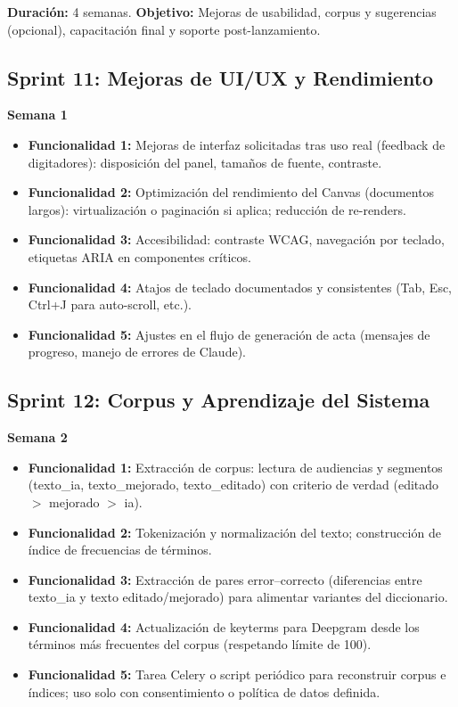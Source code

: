 \documentclass[12pt,a4paper]{report}
\begin{document}
\textbf{Duración:} 4 semanas. \textbf{Objetivo:} Mejoras de usabilidad, corpus y sugerencias (opcional), capacitación final y soporte post-lanzamiento.

\subsection{Sprint 11: Mejoras de UI/UX y Rendimiento}

\textbf{Semana 1}

\begin{itemize}
    \item \textbf{Funcionalidad 1:} Mejoras de interfaz solicitadas tras uso real (feedback de digitadores): disposición del panel, tamaños de fuente, contraste.
    \item \textbf{Funcionalidad 2:} Optimización del rendimiento del Canvas (documentos largos): virtualización o paginación si aplica; reducción de re-renders.
    \item \textbf{Funcionalidad 3:} Accesibilidad: contraste WCAG, navegación por teclado, etiquetas ARIA en componentes críticos.
    \item \textbf{Funcionalidad 4:} Atajos de teclado documentados y consistentes (Tab, Esc, Ctrl+J para auto-scroll, etc.).
    \item \textbf{Funcionalidad 5:} Ajustes en el flujo de generación de acta (mensajes de progreso, manejo de errores de Claude).
\end{itemize}

\subsection{Sprint 12: Corpus y Aprendizaje del Sistema}

\textbf{Semana 2}

\begin{itemize}
    \item \textbf{Funcionalidad 1:} Extracción de corpus: lectura de audiencias y segmentos (texto\_ia, texto\_mejorado, texto\_editado) con criterio de verdad (editado $>$ mejorado $>$ ia).
    \item \textbf{Funcionalidad 2:} Tokenización y normalización del texto; construcción de índice de frecuencias de términos.
    \item \textbf{Funcionalidad 3:} Extracción de pares error--correcto (diferencias entre texto\_ia y texto editado/mejorado) para alimentar variantes del diccionario.
    \item \textbf{Funcionalidad 4:} Actualización de keyterms para Deepgram desde los términos más frecuentes del corpus (respetando límite de 100).
    \item \textbf{Funcionalidad 5:} Tarea Celery o script periódico para reconstruir corpus e índices; uso solo con consentimiento o política de datos definida.
\end{itemize}
\end{document}
